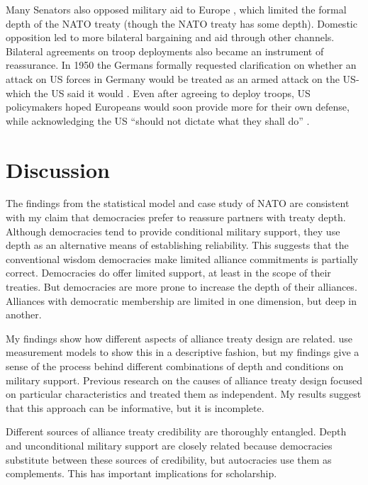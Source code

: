 \documentclass[12pt]{article}
\begin{document}
Many Senators also opposed military aid to Europe \citep[pg 285]{Acheson1969}, which limited the formal depth of the NATO treaty (though the NATO treaty has some depth). 
Domestic opposition led to more bilateral bargaining and aid through other channels. 
Bilateral agreements on troop deployments also became an instrument of reassurance. 
In 1950 the Germans formally requested clarification on whether an attack on US forces in Germany would be treated as an armed attack on the US- which the US said it would \citep[pg. 395]{Acheson1969}.  
Even after agreeing to deploy troops, US policymakers hoped Europeans would soon provide more for their own defense, while acknowledging the US ``should not dictate what they shall do'' \citep[pg. 2]{Johnson1950}. 




\section{Discussion}


The findings from the statistical model and case study of NATO are consistent with my claim that democracies prefer to reassure partners with treaty depth. 
Although democracies tend to provide conditional military support, they use depth as an alternative means of establishing reliability. 
This suggests that the conventional wisdom democracies make limited alliance commitments is partially correct.
Democracies do offer limited support, at least in the scope of their treaties. 
But democracies are more prone to increase the depth of their alliances. 
Alliances with democratic membership are limited in one dimension, but deep in another. 


My findings show how different aspects of alliance treaty design are related. 
\citet{BensonClinton2016} use measurement models to show this in a descriptive fashion, but my findings give a sense of the process behind different combinations of depth and conditions on military support. 
Previous research on the causes of alliance treaty design \citep{Benson2012, Mattes2012, Chibaetal2015} focused on particular characteristics and treated them as independent. 
My results suggest that this approach can be informative, but it is incomplete. 


Different sources of alliance treaty credibility are thoroughly entangled. 
Depth and unconditional military support are closely related because democracies substitute between these sources of credibility, but autocracies use them as complements. 
This has important implications for scholarship. 
\end{document}
